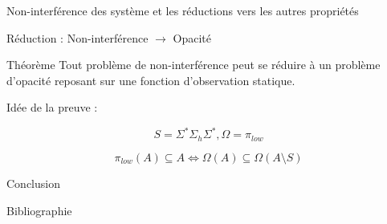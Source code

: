 \documentclass[11pt]{beamer}
\begin{document}
\begin{section}{Non-interf\'erence des syst\`eme et les r\'eductions vers les autres propri\'et\'es}
\begin{frame}{R\'eduction : Non-interf\'erence $\to$ Opacit\'e}
\begin{beamerlikethm}{Th\'eor\`eme {\cite[page 5]{BryansKMR08}}}
Tout probl\`eme de non-interf\'erence peut se r\'eduire \`a un probl\`eme d'opacit\'e reposant sur une fonction d'observation statique.
\end{beamerlikethm}

Id\'ee de la preuve :

$$S=\Sigma^*\Sigma_h\Sigma^*, \Omega = \pi_{low}$$

$$\pi_{low}(A) \subseteq A \iff \Omega(A) \subseteq \Omega(A \setminus S)$$
\end{frame}

\end{section}


\begin{section}{Conclusion}
 
\end{section}

\begin{frame}{Bibliographie}

\end{frame}
\end{document}
